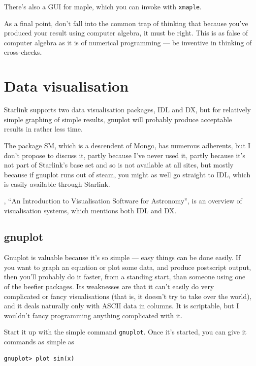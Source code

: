 \documentclass[11pt,oneside,chapters]{starlink}
\begin{document}
There's also a GUI for maple, which you can invoke with
\texttt{xmaple}.

As a final point, don't fall into the common trap of thinking that because
you've produced your result using computer algebra, it must be right.
This is as false of computer algebra as it is of numerical
programming --- be inventive in thinking of cross-checks.


\section{Data visualisation}
\label{s:visualisation}

Starlink supports two data visualisation packages, IDL and
DX, but for relatively simple graphing of simple results,
gnuplot will probably produce acceptable results in rather
less time.

The package SM, which is a descendent of
Mongo, has numerous adherents, but I don't propose to
discuss it, partly because I've never used it, partly
because it's not part of Starlink's base set and so is not
available at all sites, but mostly because if gnuplot runs
out of steam, you might as well go straight to IDL, which is
easily available through Starlink.

, ``An Introduction to
Visualisation Software for Astronomy'', is an overview
of visualisation systems, which mentions both IDL and
DX.

\subsection{gnuplot}
\label{s:gausssine-g}

Gnuplot is valuable because it's so simple --- easy things
can be done easily.  If you want to graph an equation or
plot some data, and produce postscript output, then you'll
probably do it faster, from a standing start, than someone
using one of the beefier packages.  Its weaknesses are
that it can't easily do very complicated or fancy
visualisations (that is, it doesn't try to take over the
world), and it deals naturally only with ASCII data in
columns.  It is scriptable, but I wouldn't fancy
programming anything complicated with it.

Start it up with the simple command \texttt{gnuplot}.
Once it's started, you can give it commands as simple as

\begin{verbatim}
gnuplot> plot sin(x)
\end{verbatim}
\end{document}
